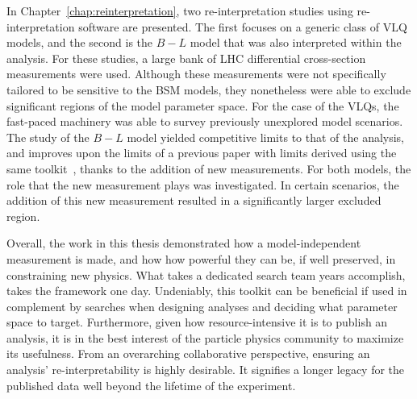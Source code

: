 In Chapter~\ref{chap:reinterpretation}, two re-interpretation studies using re-interpretation software \contur are presented. The first focuses on a generic class of VLQ models, and the second is the $B-L$ model that was also interpreted within the \ATLAS \mFourL{} analysis. For these studies, a large bank of LHC differential cross-section measurements were used. Although these measurements were not specifically tailored to be sensitive to the BSM models, they nonetheless were able to exclude significant regions of the model parameter space. For the case of the VLQs, the fast-paced \contur machinery was able to survey previously unexplored model scenarios. The study of the $B-L$ model yielded competitive limits to that of the \ATLAS \mFourL{} analysis, and improves upon the limits of a previous paper with limits derived using the same toolkit~\cite{BLcontur}, thanks to the addition of new measurements. For both models, the role that the new \ATLAS \mFourL{} measurement plays was investigated. In certain scenarios, the addition of this new measurement resulted in a significantly larger excluded region. 

Overall, the work in this thesis demonstrated how a model-independent measurement is made, and how how powerful they can be, if well preserved, in constraining new physics. What takes a dedicated search team years accomplish, takes the \contur framework one day. Undeniably, this toolkit can be beneficial if used in complement by searches when designing analyses and deciding what parameter space to target. Furthermore, given how resource-intensive it is to publish an analysis, it is in the best interest of the particle physics community to maximize its usefulness. From an overarching collaborative perspective, ensuring an analysis' re-interpretability is highly desirable. It signifies a longer legacy for the published data well beyond the lifetime of the experiment. 


